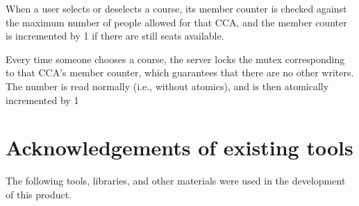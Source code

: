 When a user selects or deselects a course, its member counter is
checked against the maximum number of people allowed for that CCA,
and the member counter is incremented by 1 if there are still seats
available. 

Every time someone chooses a course,
the server locks the mutex corresponding to that CCA's member counter,
which guarantees that there are no other writers. The number is read
normally (i.e., without atomics), and is then atomically incremented
by 1 


\section{Acknowledgements of existing tools}

The following tools, libraries, and other materials were used in the
development of this product.

